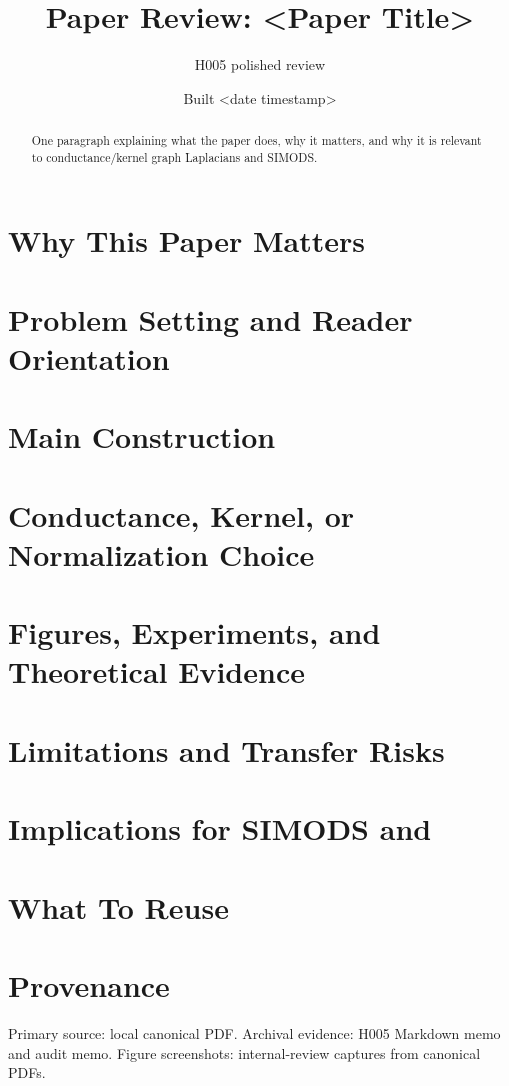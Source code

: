 \documentclass[11pt]{article}
\title{Paper Review: <Paper Title>}
\author{H005 polished review}
\date{Built <date timestamp>}
\begin{document}
\maketitle

\begin{abstract}
One paragraph explaining what the paper does, why it matters, and why it is
relevant to conductance/kernel graph Laplacians and SIMODS.
\end{abstract}

\section{Why This Paper Matters}

\section{Problem Setting and Reader Orientation}

\section{Main Construction}

\section{Conductance, Kernel, or Normalization Choice}

\section{Figures, Experiments, and Theoretical Evidence}

\section{Limitations and Transfer Risks}

\section{Implications for SIMODS and }

\section{What To Reuse}

\section*{Provenance}

Primary source: local canonical PDF. Archival evidence: H005 Markdown memo and
audit memo. Figure screenshots: internal-review captures from canonical PDFs.



\end{document}
